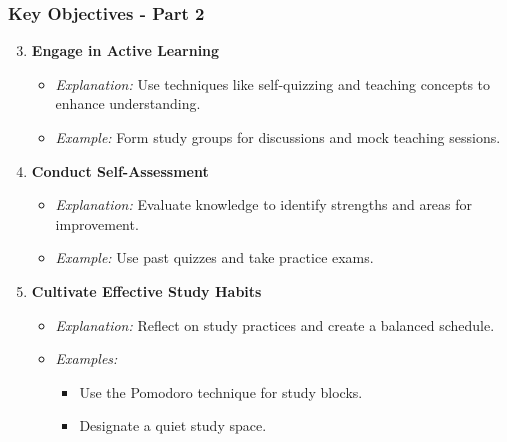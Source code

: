 \documentclass[aspectratio=169]{beamer}
\begin{document}
\begin{frame}[fragile]
    \frametitle{Key Objectives - Part 2}
    
    \begin{enumerate}
        \setcounter{enumi}{2} %
        \item \textbf{Engage in Active Learning}
        \begin{itemize}
            \item \textit{Explanation:} Use techniques like self-quizzing and teaching concepts to enhance understanding.
            \item \textit{Example:} Form study groups for discussions and mock teaching sessions.
        \end{itemize}
        
        \item \textbf{Conduct Self-Assessment}
        \begin{itemize}
            \item \textit{Explanation:} Evaluate knowledge to identify strengths and areas for improvement.
            \item \textit{Example:} Use past quizzes and take practice exams.
        \end{itemize}
        
        \item \textbf{Cultivate Effective Study Habits}
        \begin{itemize}
            \item \textit{Explanation:} Reflect on study practices and create a balanced schedule.
            \item \textit{Examples:} 
            \begin{itemize}
                \item Use the Pomodoro technique for study blocks.
                \item Designate a quiet study space.
            \end{itemize}
        \end{itemize}
    \end{enumerate}
\end{frame}
\end{document}
